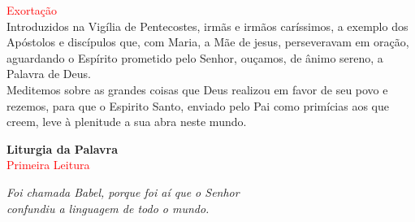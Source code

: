 \documentclass{book}
\begin{document}
\begin{flushleft}
    \newpage

    \textcolor{red}{Exortação}
    \vspace{.2cm} \\
    Introduzidos na Vigília de Pentecostes, irmãs e irmãos caríssimos, a exemplo dos Apóstolos e discípulos que, com Maria, a Mãe de jesus, perseveravam em oração, aguardando o Espírito prometido pelo Senhor, ouçamos, de ânimo sereno, a Palavra de Deus. \\
    Meditemos sobre as grandes coisas que Deus realizou em favor de seu povo e rezemos, para que o Espirito Santo, enviado pelo Pai como primícias aos que creem, leve à plenitude a sua abra neste mundo.

\end{flushleft}

\begin{center}

    \textbf{Liturgia da Palavra}
    \vspace{.5cm}\\
    \textcolor{red}{Primeira Leitura}

\end{center}

\begin{flushright}
    \textit{Foi chamada Babel, porque foi aí que o Senhor \\ confundiu a linguagem de todo o mundo.}
\end{flushright}
\end{document}
